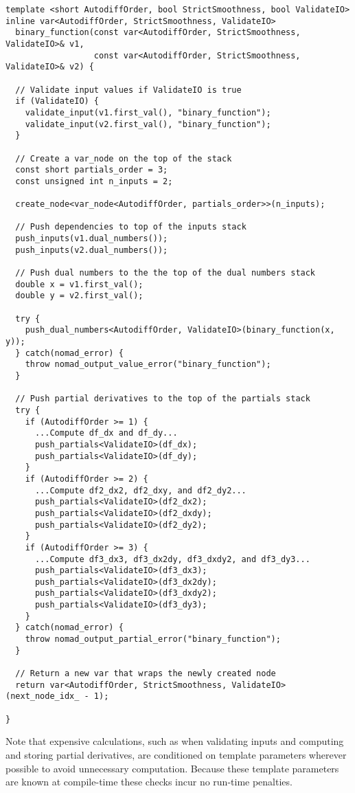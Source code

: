 \begin{verbatim}
template <short AutodiffOrder, bool StrictSmoothness, bool ValidateIO>
inline var<AutodiffOrder, StrictSmoothness, ValidateIO>
  binary_function(const var<AutodiffOrder, StrictSmoothness, ValidateIO>& v1,
                  const var<AutodiffOrder, StrictSmoothness, ValidateIO>& v2) {
    
  // Validate input values if ValidateIO is true
  if (ValidateIO) {
    validate_input(v1.first_val(), "binary_function");
    validate_input(v2.first_val(), "binary_function");
  }
      
  // Create a var_node on the top of the stack
  const short partials_order = 3;
  const unsigned int n_inputs = 2;
    
  create_node<var_node<AutodiffOrder, partials_order>>(n_inputs);

  // Push dependencies to top of the inputs stack
  push_inputs(v1.dual_numbers());
  push_inputs(v2.dual_numbers());

  // Push dual numbers to the the top of the dual numbers stack
  double x = v1.first_val();
  double y = v2.first_val();
    
  try {
    push_dual_numbers<AutodiffOrder, ValidateIO>(binary_function(x, y));
  } catch(nomad_error) {
    throw nomad_output_value_error("binary_function");
  }
    
  // Push partial derivatives to the top of the partials stack
  try {
    if (AutodiffOrder >= 1) {
      ...Compute df_dx and df_dy...
      push_partials<ValidateIO>(df_dx);
      push_partials<ValidateIO>(df_dy);
    }
    if (AutodiffOrder >= 2) {
      ...Compute df2_dx2, df2_dxy, and df2_dy2...
      push_partials<ValidateIO>(df2_dx2);
      push_partials<ValidateIO>(df2_dxdy);
      push_partials<ValidateIO>(df2_dy2);
    }
    if (AutodiffOrder >= 3) {
      ...Compute df3_dx3, df3_dx2dy, df3_dxdy2, and df3_dy3...
      push_partials<ValidateIO>(df3_dx3);
      push_partials<ValidateIO>(df3_dx2dy);
      push_partials<ValidateIO>(df3_dxdy2);
      push_partials<ValidateIO>(df3_dy3);
    }
  } catch(nomad_error) {
    throw nomad_output_partial_error("binary_function");
  }

  // Return a new var that wraps the newly created node
  return var<AutodiffOrder, StrictSmoothness, ValidateIO>(next_node_idx_ - 1);
    
}
\end{verbatim}
%
Note that expensive calculations, such as when validating inputs and computing
and storing partial derivatives, are conditioned on template parameters wherever 
possible to avoid unnecessary computation.  Because these template parameters 
are known at compile-time these checks incur no run-time penalties.

